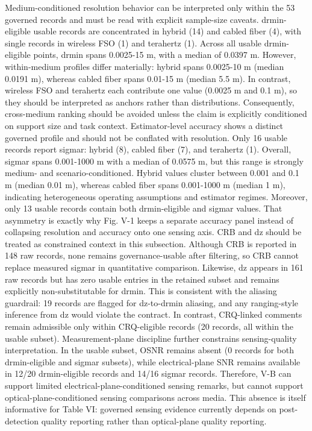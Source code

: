 {}Medium-conditioned resolution behavior can be interpreted only within the 53 governed records and must be read with explicit sample-size caveats. drmin-eligible usable records are concentrated in hybrid (14) and cabled fiber (4), with single records in wireless FSO (1) and terahertz (1). Across all usable drmin-eligible points, drmin spans 0.0025-15 m, with a median of 0.0397 m. However, within-medium profiles differ materially: hybrid spans 0.0025-10 m (median 0.0191 m), whereas cabled fiber spans 0.01-15 m (median 5.5 m). In contrast, wireless FSO and terahertz each contribute one value (0.0025 m and 0.1 m), so they should be interpreted as anchors rather than distributions. Consequently, cross-medium ranking should be avoided unless the claim is explicitly conditioned on support size and task context.\markdownRendererParagraphSeparator
{}Estimator-level accuracy shows a distinct governed profile and should not be conflated with resolution. Only 16 usable records report sigma\markdownRendererUnderscore{}r: hybrid (8), cabled fiber (7), and terahertz (1). Overall, sigma\markdownRendererUnderscore{}r spans 0.001-1000 m with a median of 0.0575 m, but this range is strongly medium- and scenario-conditioned. Hybrid values cluster between 0.001 and 0.1 m (median 0.01 m), whereas cabled fiber spans 0.001-1000 m (median 1 m), indicating heterogeneous operating assumptions and estimator regimes. Moreover, only 13 usable records contain both drmin-eligible and sigma\markdownRendererUnderscore{}r values. That asymmetry is exactly why Fig. V-1 keeps a separate accuracy panel instead of collapsing resolution and accuracy onto one sensing axis.\markdownRendererParagraphSeparator
{}CRB and dz should be treated as constrained context in this subsection. Although CRB is reported in 148 raw records, none remains governance-usable after filtering, so CRB cannot replace measured sigma\markdownRendererUnderscore{}r in quantitative comparison. Likewise, dz appears in 161 raw records but has zero usable entries in the retained subset and remains explicitly non-substitutable for drmin. This is consistent with the aliasing guardrail: 19 records are flagged for dz-to-drmin aliasing, and any ranging-style inference from dz would violate the contract. In contrast, CRQ-linked comments remain admissible only within CRQ-eligible records (20 records, all within the usable subset).\markdownRendererParagraphSeparator
{}Measurement-plane discipline further constrains sensing-quality interpretation. In the usable subset, OSNR remains absent (0 records for both drmin-eligible and sigma\markdownRendererUnderscore{}r subsets), while electrical-plane SNR remains available in 12/20 drmin-eligible records and 14/16 sigma\markdownRendererUnderscore{}r records. Therefore, V-B can support limited electrical-plane-conditioned sensing remarks, but cannot support optical-plane-conditioned sensing comparisons across media. This absence is itself informative for Table VI: governed sensing evidence currently depends on post-detection quality reporting rather than optical-plane quality reporting.\markdownRendererParagraphSeparator

